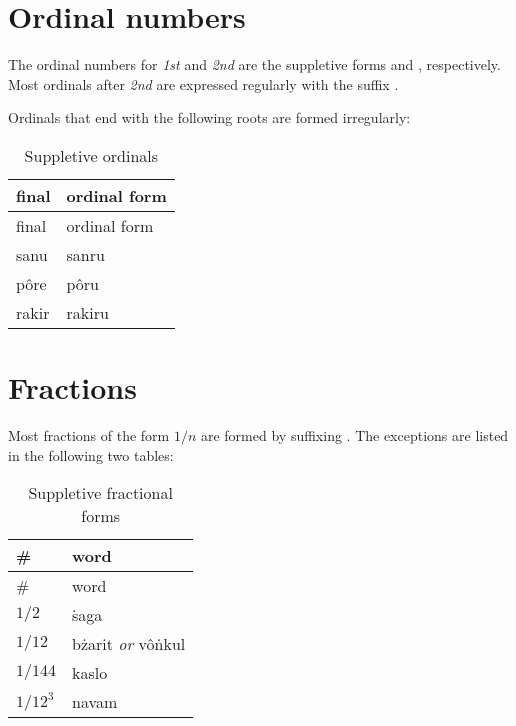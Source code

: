 \documentclass{book}
\begin{document}
\section{Ordinal numbers}

The ordinal numbers for \emph{1st} and \emph{2nd} are the suppletive forms  and , respectively. Most ordinals after \emph{2nd} are expressed regularly with the suffix .

Ordinals that end with the following roots are formed irregularly:

\begin{longtable}[c]{|l|l|}
    \caption{Suppletive ordinals} \\
    
    \hline
    final & ordinal form \\
    \hline
    \endfirsthead
    
    \hline
    final & ordinal form \\
    \hline
    \endhead
    
    \hline
    \endfoot
    
    \hline
    \endlastfoot
    
    sanu & sanru \\
    pôre & pôru \\
    rakir & rakiru \\
\end{longtable}

\section{Fractions}

Most fractions of the form $1/n$ are formed by suffixing . The exceptions are listed in the following two tables:

\begin{longtable}[c]{|l|l|}
    \caption{Suppletive fractional forms} \\
    
    \hline
    \# & word \\
    \hline
    \endfirsthead
    
    \hline
    \# & word \\
    \hline
    \endhead
    
    \hline
    \endfoot
    
    \hline
    \endlastfoot
    
    $1/2$ & ṡaga \\
    $1/12$ & bżarit \emph{or} vôṅkul \\
    $1/144$ & kaslo \\
    $1/12^3$ & navam
\end{longtable}
\end{document}
